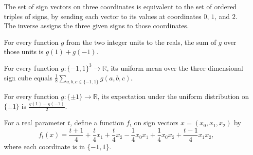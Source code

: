 \begin{definition}
\label{FABL.signCubeThreeEquiv}
\leanok
{}
The set of sign vectors on three coordinates is equivalent to the set of ordered triples
of signs, by sending each vector to its values at coordinates $0$, $1$, and $2$. The
inverse assigns the three given signs to those coordinates.
\end{definition}

\begin{theorem}
\label{FABL.sum_sign_eq}
\leanok
{}
For every function $g$ from the two integer units to the reals, the sum of $g$ over
those units is $g(1)+g(-1)$.
\end{theorem}

\begin{theorem}
\label{FABL.expect_signCube_three_eq}
\leanok
{}
For every function $g:\{−1,1\}^3\to\mathbb R$, its uniform mean over the
three-dimensional sign cube equals $\frac18\sum_{a,b,c\in\{−1,1\}}g(a,b,c)$.
\end{theorem}

\begin{theorem}
\label{FABL.pmfExpectation_uniformSign_eq_average}
\leanok
{}
For every function $g:\{\pm1\}\to\mathbb R$, its expectation under the uniform
distribution on $\{\pm1\}$ is $\frac{g(1)+g(-1)}{2}$.
\end{theorem}

\begin{definition}
\label{FABL.osssCounterexampleAt}
\leanok
{}
For a real parameter $t$, define a function $f_t$ on sign vectors $x=(x_0,x_1,x_2)$ by
\[
f_t(x)=\frac{t+1}{4}+\frac{t}{4}x_1+\frac{t}{4}x_2-\frac{1}{4}x_0x_1+\frac{1}{4}x_0x_2+\frac{t-1}{4}x_1x_2,
\]
where each coordinate is in $\{-1,1\}$.
\end{definition}

